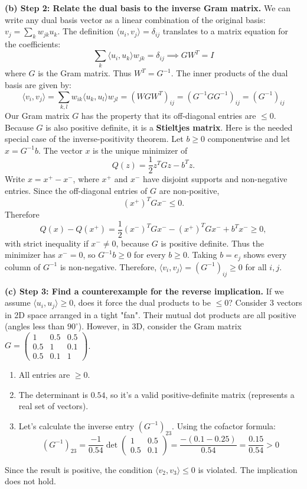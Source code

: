 \begin{solution}
\textbf{(b) Step 2: Relate the dual basis to the inverse Gram matrix.}
We can write any dual basis vector as a linear combination of the original basis: $v_j = \sum_k w_{jk} u_k$.
The definition $\langle u_i, v_j \rangle = \delta_{ij}$ translates to a matrix equation for the coefficients:
\[ \sum_k \langle u_i, u_k \rangle w_{jk} = \delta_{ij} \implies G W^T = I \]
where $G$ is the Gram matrix. Thus $W^T = G^{-1}$.
The inner products of the dual basis are given by:
\[ \langle v_i, v_j \rangle = \sum_{k,l} w_{ik} \langle u_k, u_l \rangle w_{jl} = (W G W^T)_{ij} = (G^{-1} G G^{-1})_{ij} = (G^{-1})_{ij} \]
Our Gram matrix $G$ has the property that its off-diagonal entries are $\leq 0$. Because $G$ is also positive definite, it is a \textbf{Stieltjes matrix}.
Here is the needed special case of the inverse-positivity theorem. Let $b\geq 0$ componentwise and let $x=G^{-1}b$. The vector $x$ is the unique minimizer of
\[
Q(z)=\frac12 z^T Gz-b^Tz.
\]
Write $x=x^+-x^-$, where $x^+$ and $x^-$ have disjoint supports and non-negative entries. Since the off-diagonal entries of $G$ are non-positive,
\[
(x^+)^TGx^-\leq 0.
\]
Therefore
\[
Q(x)-Q(x^+)=\frac12 (x^-)^TGx^--(x^+)^TGx^-+b^Tx^-\geq 0,
\]
with strict inequality if $x^-\neq 0$, because $G$ is positive definite. Thus the minimizer has $x^-=0$, so $G^{-1}b\geq 0$ for every $b\geq 0$. Taking $b=e_j$ shows every column of $G^{-1}$ is non-negative.
Therefore, $\langle v_i, v_j \rangle=(G^{-1})_{ij}\geq 0$ for all $i, j$.

\textbf{(c) Step 3: Find a counterexample for the reverse implication.}
If we assume $\langle u_i, u_j \rangle \geq 0$, does it force the dual products to be $\leq 0$?
Consider 3 vectors in 2D space arranged in a tight "fan". Their mutual dot products are all positive (angles less than $90^\circ$).
However, in 3D, consider the Gram matrix $G = \begin{pmatrix} 1 & 0.5 & 0.5 \\ 0.5 & 1 & 0.1 \\ 0.5 & 0.1 & 1 \end{pmatrix}$.
\begin{enumerate}
    \item All entries are $\geq 0$.
    \item The determinant is $0.54$, so it's a valid positive-definite matrix (represents a real set of vectors).
    \item Let's calculate the inverse entry $(G^{-1})_{23}$. Using the cofactor formula:
    \[ (G^{-1})_{23} = \frac{-1}{0.54} \det \begin{pmatrix} 1 & 0.5 \\ 0.5 & 0.1 \end{pmatrix} = \frac{-(0.1 - 0.25)}{0.54} = \frac{0.15}{0.54} > 0 \]
\end{enumerate}
Since the result is positive, the condition $\langle v_2, v_3 \rangle \leq 0$ is violated. The implication does not hold.
\end{solution}

